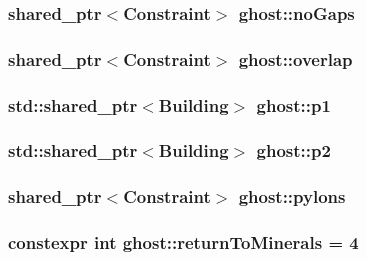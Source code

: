 \hypertarget{namespaceghost_a4b6df9d0b61991e356eb28353a73be30}{
\subsubsection[{no\-Gaps}]{\setlength{\rightskip}{0pt plus 5cm}shared\-\_\-ptr$<${\bf Constraint}$>$ ghost\-::no\-Gaps}}\label{namespaceghost_a4b6df9d0b61991e356eb28353a73be30}
\hypertarget{namespaceghost_a7a91cd37137a7eae220126fcbb8ff96b}{
\subsubsection[{overlap}]{\setlength{\rightskip}{0pt plus 5cm}shared\-\_\-ptr$<${\bf Constraint}$>$ ghost\-::overlap}}\label{namespaceghost_a7a91cd37137a7eae220126fcbb8ff96b}
\hypertarget{namespaceghost_ad597936cfadde60ce8c6ed70f14c242c}{
\subsubsection[{p1}]{\setlength{\rightskip}{0pt plus 5cm}std\-::shared\-\_\-ptr$<${\bf Building}$>$ ghost\-::p1}}\label{namespaceghost_ad597936cfadde60ce8c6ed70f14c242c}
\hypertarget{namespaceghost_a47f813abed554f342cbabdd87c34a89e}{
\subsubsection[{p2}]{\setlength{\rightskip}{0pt plus 5cm}std\-::shared\-\_\-ptr$<${\bf Building}$>$ ghost\-::p2}}\label{namespaceghost_a47f813abed554f342cbabdd87c34a89e}
\hypertarget{namespaceghost_a381584b094da85f582a9b24eedf21411}{
\subsubsection[{pylons}]{\setlength{\rightskip}{0pt plus 5cm}shared\-\_\-ptr$<${\bf Constraint}$>$ ghost\-::pylons}}\label{namespaceghost_a381584b094da85f582a9b24eedf21411}
\hypertarget{namespaceghost_ada242341970bc16ae93c8343d092b9d1}{
\subsubsection[{return\-To\-Minerals}]{\setlength{\rightskip}{0pt plus 5cm}constexpr int ghost\-::return\-To\-Minerals = 4}}\label{namespaceghost_ada242341970bc16ae93c8343d092b9d1}
